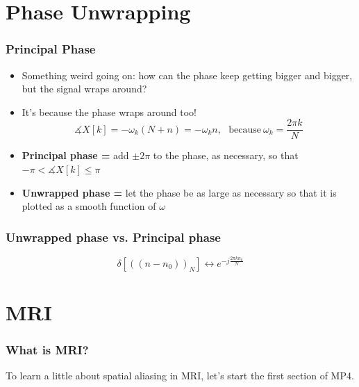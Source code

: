 \documentclass{beamer}
\begin{document}
\section[Phase]{Phase Unwrapping}
\setcounter{subsection}{1}


\begin{frame}
  \frametitle{Principal Phase}

  \begin{itemize}
  \item Something weird going on: how can the phase keep getting
    bigger and bigger, but the signal wraps around?
  \item It's because the phase wraps around too!
    \begin{displaymath}
      \measuredangle X[k] = -\omega_k (N+n) = -\omega_k n,~~~\mbox{because}~\omega_k=\frac{2\pi k}{N}
    \end{displaymath}
  \item {\bf Principal phase =} add $\pm 2\pi$ to the phase, as
    necessary, so that $-\pi< \measuredangle X[k]\le \pi$
  \item {\bf Unwrapped phase = } let the phase be as large as
    necessary so that it is plotted as a smooth function of $\omega$
  \end{itemize}
\end{frame}

\begin{frame}
  \frametitle{Unwrapped phase vs. Principal phase}

  \begin{displaymath}
    \delta\left[(\!(n-n_0)\!)_N\right] \leftrightarrow e^{-j\frac{2\pi kn_0}{N}}
  \end{displaymath}
  
  \centerline{}

\end{frame}


\section[MRI]{MRI}
\setcounter{subsection}{1}

\begin{frame}
  \frametitle{What is MRI?}

  To learn a little about spatial aliasing in MRI, let's start the first section of MP4.
\end{frame}
\end{document}
